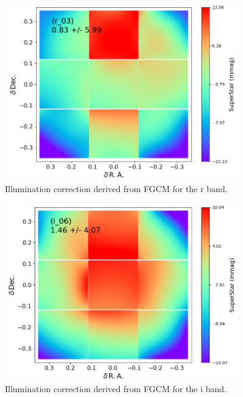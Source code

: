 \begin{figure}
  \begin{center}
    \includegraphics[width=0.9\textwidth]{photometric_calibration_figures/illumcorr_r.png}
  \end{center}
  \caption{Illumination correction derived from FGCM for the r band.}
\end{figure}

\begin{figure}
  \begin{center}
    \includegraphics[width=0.9\textwidth]{photometric_calibration_figures/illumcorr_i.png}
  \end{center}
  \caption{Illumination correction derived from FGCM for the i band.}
\end{figure}

